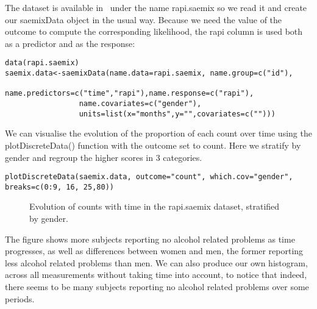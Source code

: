 The dataset is available in \saemix~under the name {\sf rapi.saemix} so we read it and create our saemixData object in the usual way. Because we need the value of the outcome to compute the corresponding likelihood, the {\sf rapi} column is used both as a predictor and as the response:
\begin{verbatim}
data(rapi.saemix)
saemix.data<-saemixData(name.data=rapi.saemix, name.group=c("id"),
                 name.predictors=c("time","rapi"),name.response=c("rapi"),
                 name.covariates=c("gender"),
                 units=list(x="months",y="",covariates=c("")))
\end{verbatim}

We can visualise the evolution of the proportion of each count over time using the {\sf plotDiscreteData()} function with the outcome set to {\sf count}. Here we stratify by gender and regroup the higher scores in 3 categories.
\begin{verbatim}
plotDiscreteData(saemix.data, outcome="count", which.cov="gender", breaks=c(0:9, 16, 25,80))
\end{verbatim}
\begin{figure}[!h]
\begin{center}
\end{center}
\par \kern -0.5cm
\caption{Evolution of counts with time in the {\sf rapi.saemix} dataset, stratified by gender.} \label{fig:rapiData}
\end{figure}
The figure shows more subjects reporting no alcohol related problems as time progresses, as well as differences between women and men, the former reporting less alcohol related problems than men. We can also produce our own histogram, across all measurements without taking time into account, to notice that indeed, there seems to be many subjects reporting no alcohol related problems over some periods. 

